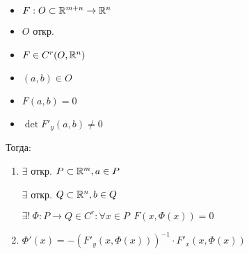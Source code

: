 \begin{theorem}\itemfix
    \begin{itemize}
        \item $F: O\subset\mathbb{R}^{m+n}\to\mathbb{R}^n$
        \item $O$ откр.
        \item $F\in C^r (O, \mathbb{R}^n)$
        \item $(a, b)\in O$
        \item $F(a, b) = 0$
        \item $\det F'_y(a, b)\not=0$
    \end{itemize}
    Тогда:
    \begin{enumerate}
        \item $\exists$ откр. $P\subset\mathbb{R}^{m}, a\in P$

              $\exists$ откр. $Q\subset\mathbb{R}^{n}, b\in Q$

              $\exists!\ \Phi : P\to Q\in C^r : \forall x \in P \ \ F(x, \Phi(x)) = 0$
        \item $\Phi'(x) = -\left(F'_y(x, \Phi(x))\right)^{-1}\cdot F'_x(x, \Phi(x))$
    \end{enumerate}
\end{theorem}
